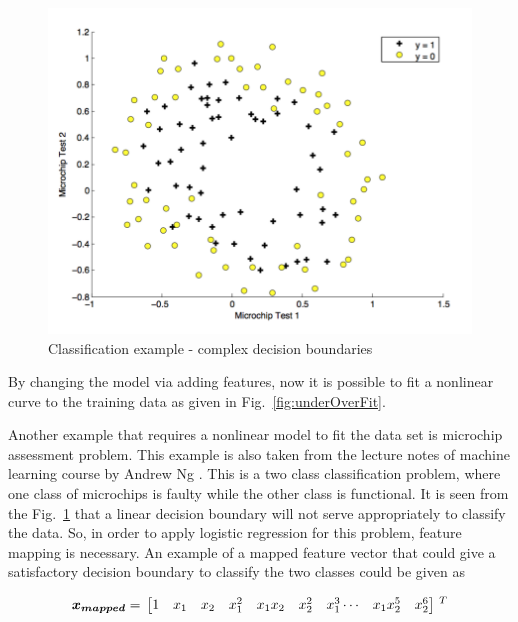 \begin{figure}
\begin{center}
\includegraphics[width=13cm]{figures/classificationMicrochip}    %
\caption{Classification example - complex decision boundaries \cite{andrewNg_MachLearning}} 
\label{fig:classificationEx3}
\end{center}
\end{figure}

By changing the model via adding features, now it is possible to fit a nonlinear curve to the training data as given in Fig.~\ref{fig:underOverFit}.

Another example that requires a nonlinear model to fit the data set is microchip assessment problem.
This example is also taken from the lecture notes of machine learning course by Andrew Ng \cite{andrewNgMachLearning}. 
This is a two class classification problem, where one class of microchips is faulty while the other class is functional.
It is seen from the Fig.~\ref{fig:classificationEx3} that a linear decision boundary will not serve appropriately to classify the data. 
So, in order to apply logistic regression for this problem, feature mapping is necessary. 
An example of a mapped feature vector that could give a satisfactory decision boundary to classify the two classes could be given as

\begin{equation}{\label{eqn:featureMapping2}}
\bm{x_{mapped}}
=\,
\begin{bmatrix}
1 & x_1 & x_2 & x_1^2 & x_1x_2 & x_2^2 & x_1^3 \cdots & x_1x_2^5 & x_2^6 
\end{bmatrix}
\,^ T
\end{equation} 


